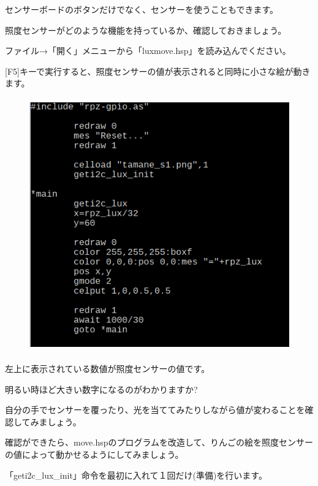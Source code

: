 センサーボードのボタンだけでなく、センサーを使うこともできます。

照度センサーがどのような機能を持っているか、確認しておきましょう。


ファイル→「開く」メニューから「luxmove.hsp」を読み込んでください。

[F5]キーで実行すると、照度センサーの値が表示されると同時に小さな絵が動きます。

\begin{figure}[H]
    \begin{center}
      \includegraphics[keepaspectratio,width=11.615cm,height=10.94cm]{text04-img/s_luxmovesrc.png}
    \end{center}
    \label{fig:prog_menu}
\end{figure}

左上に表示されている数値が照度センサーの値です。

明るい時ほど大きい数字になるのがわかりますか?

自分の手でセンサーを覆ったり、光を当ててみたりしながら値が変わることを確認してみましょう。

確認ができたら、move.hspのプログラムを改造して、りんごの絵を照度センサーの値によって動かせるようにしてみましょう。


\begin{description}
    \item {}
\end{description}


「geti2c\_lux\_init」命令を最初に入れて１回だけ(準備)を行います。


